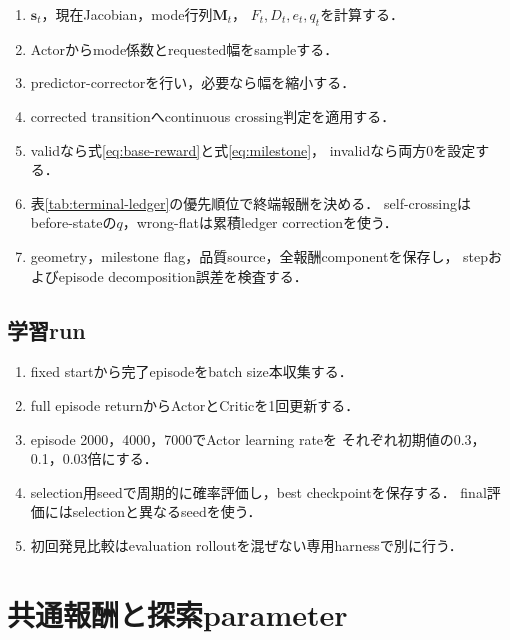 \documentclass[a4paper,11pt]{ltjsarticle}
\begin{document}
\begin{enumerate}
 \item $\bm s_t$，現在Jacobian，mode行列$\bm M_t$，
 $F_t,D_t,e_t,q_t$を計算する．
 \item Actorからmode係数とrequested幅をsampleする．
 \item predictor-correctorを行い，必要なら幅を縮小する．
 \item corrected transitionへcontinuous crossing判定を適用する．
 \item validなら式\eqref{eq:base-reward}と式\eqref{eq:milestone}，
 invalidなら両方0を設定する．
 \item 表\ref{tab:terminal-ledger}の優先順位で終端報酬を決める．
 self-crossingはbefore-stateの$q$，wrong-flatは累積ledger correctionを使う．
 \item geometry，milestone flag，品質source，全報酬componentを保存し，
 stepおよびepisode decomposition誤差を検査する．
\end{enumerate}

\subsection{学習run}

\begin{enumerate}
 \item fixed startから完了episodeをbatch size本収集する．
 \item full episode returnからActorとCriticを1回更新する．
 \item episode 2000，4000，7000でActor learning rateを
 それぞれ初期値の0.3，0.1，0.03倍にする．
 \item selection用seedで周期的に確率評価し，best checkpointを保存する．
 final評価にはselectionと異なるseedを使う．
 \item 初回発見比較はevaluation rolloutを混ぜない専用harnessで別に行う．
\end{enumerate}

\section{共通報酬と探索parameter}
\label{sec:parameters}
\end{document}
